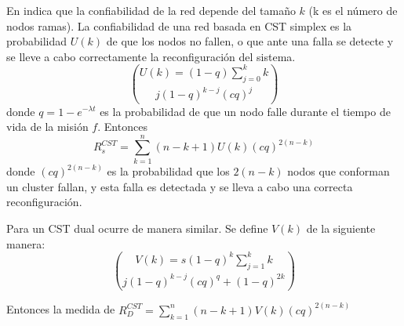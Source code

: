 En \cite{Tai99} indica que la confiabilidad de la red depende del tamaño $k$ (k es el número de nodos ramas). La confiabilidad de una red basada en \ac{CST} simplex es la probabilidad $U(k)$ de que los nodos no fallen, o que ante una falla se detecte y se lleve a cabo correctamente la reconfiguración del sistema. $$U(k) = (1-q) \sum_{j=0}^{k} {k}\choose{j} (1-q)^{k-j} (cq)^j $$ donde $q = 1-e^{-\lambda t}$ es la probabilidad de que un nodo falle durante el tiempo de vida de la misión $f$. Entonces $$R_s^{CST} = \sum_{k=1}^n (n-k+1)U(k)(cq)^{2(n-k)}$$ donde $(cq)^{2(n-k)}$ es la probabilidad que los  $2(n-k)$ nodos que conforman un cluster fallan, y esta falla es detectada y se lleva a cabo una correcta reconfiguración.

Para un \ac{CST} dual ocurre de manera similar. Se define $V(k)$ de la siguiente manera: $$V(k) = s(1-q)^k \sum_{j=1}^k {k}\choose{j} (1-q)^{k-j} (cq)^q + (1-q)^{2k}$$

Entonces la medida de $R_D^{CST} =  \sum_{k=1}^n (n-k+1) V(k) (cq)^{2(n-k)}$
